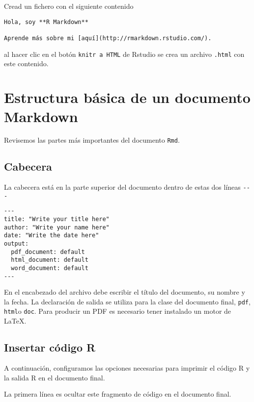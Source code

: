 \documentclass[
]{book}
\begin{document}
Cread un fichero con el siguiente contenido

\begin{verbatim}
Hola, soy **R Markdown**

Aprende más sobre mi [aquí](http://rmarkdown.rstudio.com/).
\end{verbatim}

al hacer clic en el botón \texttt{knitr\ a\ HTML} de Rstudio se crea un archivo \texttt{.html} con este contenido.

\hypertarget{estructura-buxe1sica-de-un-documento-markdown}{%
\section{Estructura básica de un documento Markdown}\label{estructura-buxe1sica-de-un-documento-markdown}}

Revisemos las partes más importantes del documento \texttt{Rmd}.

\hypertarget{cabecera}{%
\subsection{Cabecera}\label{cabecera}}

La cabecera está en la parte superior del documento dentro de estas dos líneas \texttt{-\/-\/-}

\begin{verbatim}
---
title: "Write your title here"
author: "Write your name here"
date: "Write the date here"
output:
  pdf_document: default
  html_document: default
  word_document: default
---
\end{verbatim}

En el encabezado del archivo debe escribir el título del documento, su nombre y la fecha. La declaración de salida se utiliza para la clase del documento final, \texttt{pdf}, \texttt{html}o \texttt{doc}. Para producir un PDF es necesario tener instalado un motor de LaTeX.

\hypertarget{insertar-cuxf3digo-r}{%
\subsection{Insertar código R}\label{insertar-cuxf3digo-r}}

A continuación, configuramos las opciones necesarias para imprimir el código R y la salida R en el documento final.

La primera línea es ocultar este fragmento de código en el documento final.
\end{document}
